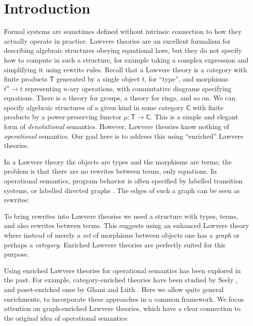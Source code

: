 \documentclass{amsart}
\theoremstyle{definition}
\newcommand{\C}{\mathsf{C}}
\newcommand{\T}{\mathsf{T}}
\newcommand{\maps}{\colon}
\begin{document}
\section{Introduction}

Formal systems are sometimes defined without intrinsic connection to how they actually operate in practice.   Lawvere theories  \cite{lawvere} are an excellent formalism for describing algebraic structures obeying equational laws, but they do not specify how to compute in such a structure, for example taking a complex expression and simplifying it using rewrite rules.   Recall that a Lawvere theory is a category with finite products $\T$ generated by a single object $t$, for ``type'', and morphisms $t^n \to t$ representing $n$-ary operations, with commutative diagrams specifying equations.   There is a theory for groups, a theory for rings, and so on.   We can specify algebraic structures of a given kind in some category $\C$ with finite products by a power-preserving functor $\mu \maps\T \to \C$.   This is a simple and elegant form of \emph{denotational} semantics.    However, Lawvere theories know nothing of \emph{operational} semantics.  Our goal here is to address this using ``enriched'' Lawvere theories.

In a Lawvere theory the objects are types and the morphisms are terms; the problem is that
there are no rewrites between terms, only equations.   In operational semantics, program behavior is often specified by labelled transition systems, or labelled directed graphs \cite{sos}.  The edges of such a graph can be seen as rewrites:
\begin{center}\end{center}
To bring rewrites into Lawvere theories we need a structure with types, terms, and also rewrites
between terms.   This suggests using an enhanced Lawvere theory where instead of merely
a \emph{set} of morphisms between objects one has a \emph{graph} or perhaps a \emph{category}. Enriched Lawvere theories are perfectly suited for this purpose.

Using enriched Lawvere theories for operational semantics has been explored in the past. For example, category-enriched theories have been studied by Seely \cite{seely}, and poset-enriched ones by Ghani and L\"uth \cite{ghani}.  Here we allow quite general enrichments, to incorporate these approaches in a common framework.  We focus attention on graph-enriched Lawvere theories, which have a clear connection to the original idea of operational semantics:
\end{document}
